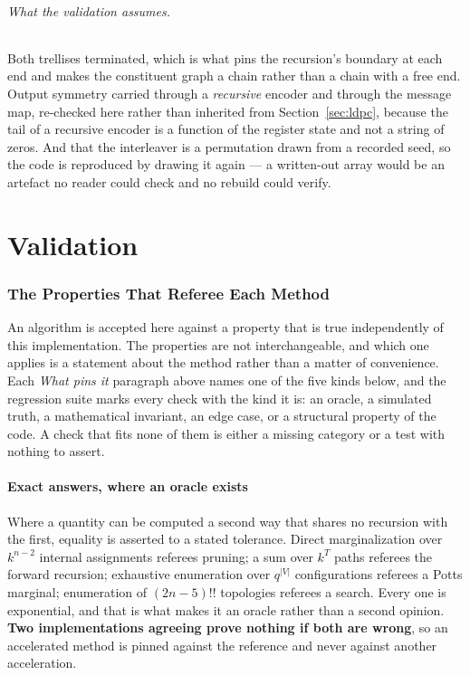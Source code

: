 \documentclass[11pt,a4paper]{article}
\begin{document}
\paragraph{What the validation assumes.}
Both trellises terminated, which is what pins the recursion's boundary at
each end and makes the constituent graph a chain rather than a chain with a
free end. Output symmetry carried through a \emph{recursive} encoder and
through the message map, re-checked here rather than inherited from
Section~\ref{sec:ldpc}, because the tail of a recursive encoder is a
function of the register state and not a string of zeros. And that the
interleaver is a permutation drawn from a recorded seed, so the code is
reproduced by drawing it again --- a written-out array would be an artefact
no reader could check and no rebuild could verify.

\part{Validation}

\section{The Properties That Referee Each Method}
\label{sec:properties}

An algorithm is accepted here against a property that is true independently of
this implementation. The properties are not interchangeable, and which one
applies is a statement about the method rather than a matter of convenience.
Each \emph{What pins it} paragraph above names one of the five kinds below,
and the regression suite marks every check with the kind it is: an oracle, a
simulated truth, a mathematical invariant, an edge case, or a structural
property of the code. A check that fits none of them is either a missing
category or a test with nothing to assert.

\subsection{Exact answers, where an oracle exists}
Where a quantity can be computed a second way that shares no recursion with the
first, equality is asserted to a stated tolerance. Direct marginalization over
$k^{n-2}$ internal assignments referees pruning; a sum over $k^T$ paths
referees the forward recursion; exhaustive enumeration over $q^{|V|}$
configurations referees a Potts marginal; enumeration of $(2n-5)!!$ topologies
referees a search. Every one is exponential, and that is what makes it an
oracle rather than a second opinion. \textbf{Two implementations agreeing prove
nothing if both are wrong}, so an accelerated method is pinned against the
reference and never against another acceleration.
\end{document}

